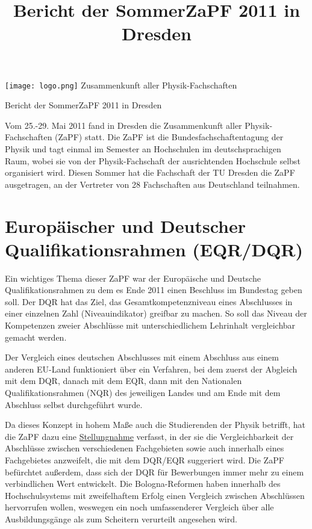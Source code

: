 \documentclass{scrartcl}
\title{Bericht der SommerZaPF 2011 in Dresden}
\author{}
\date{}
\begin{document}
\hspace{0.87\textwidth}
\begin{minipage}{120pt}
\vspace{-1.8cm}
\texttt{[image: logo.png]}
\centering
\small Zusammenkunft aller Physik-Fachschaften
\end{minipage}

\begin{center}
\vspace{1.5cm}
\huge{Bericht der SommerZaPF 2011 in Dresden} 
\vspace{1cm}
\end{center}

Vom 25.-29. Mai 2011 fand in Dresden die Zusammenkunft aller Physik-Fachschaften (ZaPF) statt. Die ZaPF ist die
Bundesfachschaftentagung der Physik und tagt einmal im Semester an Hochschulen im deutschsprachigen Raum, wobei sie von
der Physik-Fachschaft der ausrichtenden Hochschule selbst organisiert wird. Diesen Sommer hat die Fachschaft der TU
Dresden die ZaPF ausgetragen, an der Vertreter von 28 Fachschaften aus Deutschland teilnahmen.


\section*{Europäischer und Deutscher Qualifikationsrahmen (EQR/DQR)}
Ein wichtiges Thema dieser ZaPF war der Europäische und Deutsche Qualifikationsrahmen zu dem es Ende 2011 einen
Beschluss im Bundestag geben soll. Der DQR hat das Ziel, das Gesamtkompetenzniveau eines Abschlusses in einer
einzelnen Zahl (Niveauindikator) greifbar zu machen. So soll das Niveau der Kompetenzen zweier Abschlüsse
mit unterschiedlichem Lehrinhalt vergleichbar gemacht werden.

Der Vergleich eines deutschen Abschlusses mit einem
Abschluss aus einem anderen EU-Land funktioniert über ein Verfahren, bei dem zuerst der Abgleich mit dem DQR, danach
mit dem EQR, dann mit den Nationalen Qualifikationsrahmen (NQR) des jeweiligen Landes und am Ende mit dem Abschluss 
selbst durchgeführt wurde.

Da dieses Konzept in hohem Maße auch die Studierenden der Physik betrifft, hat die ZaPF dazu eine
\href{http://zapfev.de/sites/default/files/2011_05_Stellungnahme_EQR-DQR_0.pdf}{Stellungnahme} verfasst, in der sie die
Vergleichbarkeit der Abschlüsse
zwischen verschiedenen Fachgebieten sowie auch innerhalb eines Fachgebietes anzweifelt, die mit dem DQR/EQR suggeriert
wird. Die ZaPF befürchtet außerdem, dass sich der DQR für Bewerbungen immer mehr zu einem verbindlichen Wert entwickelt.
Die Bologna-Reformen haben innerhalb des Hochschulsystems mit zweifelhaftem Erfolg einen Vergleich zwischen Abschlüssen
hervorrufen wollen, weswegen ein noch umfassenderer Vergleich über alle Ausbildungsgänge als zum Scheitern verurteilt
angesehen wird. 
\end{document}
